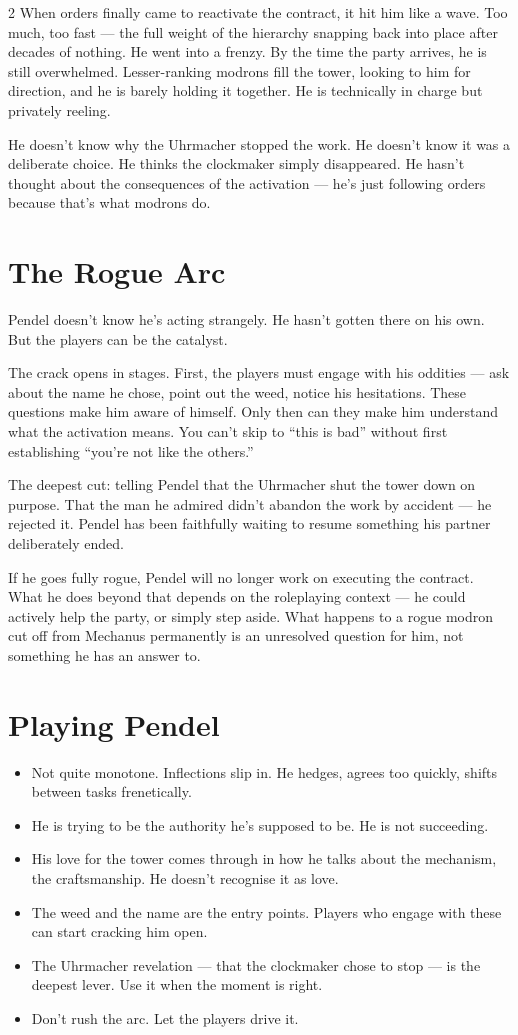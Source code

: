 \documentclass[10pt,letterpaper]{article}
\begin{document}
\begin{multicols}{2}
When orders finally came to reactivate the contract, it hit him like a wave. Too much, too fast --- the full weight of the hierarchy snapping back into place after decades of nothing. He went into a frenzy. By the time the party arrives, he is still overwhelmed. Lesser-ranking modrons fill the tower, looking to him for direction, and he is barely holding it together. He is technically in charge but privately reeling.

He doesn't know why the Uhrmacher stopped the work. He doesn't know it was a deliberate choice. He thinks the clockmaker simply disappeared. He hasn't thought about the consequences of the activation --- he's just following orders because that's what modrons do.

\section*{The Rogue Arc}
Pendel doesn't know he's acting strangely. He hasn't gotten there on his own. But the players can be the catalyst.

The crack opens in stages. First, the players must engage with his oddities --- ask about the name he chose, point out the weed, notice his hesitations. These questions make him aware of himself. Only then can they make him understand what the activation means. You can't skip to ``this is bad'' without first establishing ``you're not like the others.''

The deepest cut: telling Pendel that the Uhrmacher shut the tower down on purpose. That the man he admired didn't abandon the work by accident --- he rejected it. Pendel has been faithfully waiting to resume something his partner deliberately ended.

If he goes fully rogue, Pendel will no longer work on executing the contract. What he does beyond that depends on the roleplaying context --- he could actively help the party, or simply step aside. What happens to a rogue modron cut off from Mechanus permanently is an unresolved question for him, not something he has an answer to.

\section*{Playing Pendel}
\begin{itemize}
\item Not quite monotone. Inflections slip in. He hedges, agrees too quickly, shifts between tasks frenetically.
\item He is trying to be the authority he's supposed to be. He is not succeeding.
\item His love for the tower comes through in how he talks about the mechanism, the craftsmanship. He doesn't recognise it as love.
\item The weed and the name are the entry points. Players who engage with these can start cracking him open.
\item The Uhrmacher revelation --- that the clockmaker chose to stop --- is the deepest lever. Use it when the moment is right.
\item Don't rush the arc. Let the players drive it.
\end{itemize}


\end{multicols}
\end{document}
